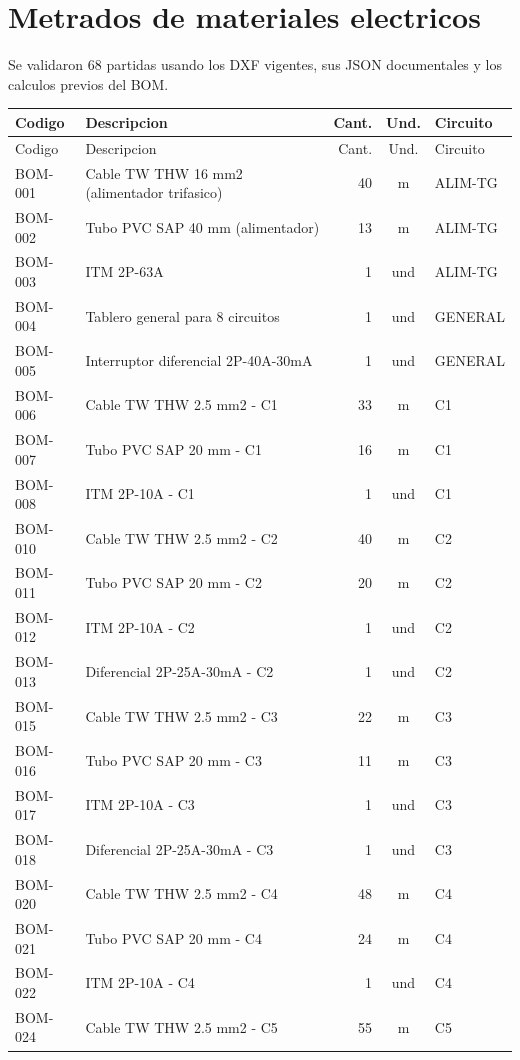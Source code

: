 \section{Metrados de materiales electricos}
Se validaron 68 partidas usando los DXF vigentes, sus JSON documentales y los calculos previos del BOM.
\scriptsize
\begin{longtable}{p{1.7cm}p{7.5cm}r c p{2.2cm}}
\toprule Codigo & Descripcion & Cant. & Und. & Circuito \\ \midrule
\endfirsthead\toprule Codigo & Descripcion & Cant. & Und. & Circuito \\ \midrule\endhead
BOM-001 & Cable TW THW 16 mm2 (alimentador trifasico) & 40 & m & ALIM-TG \\
BOM-002 & Tubo PVC SAP 40 mm (alimentador) & 13 & m & ALIM-TG \\
BOM-003 & ITM 2P-63A & 1 & und & ALIM-TG \\
BOM-004 & Tablero general para 8 circuitos & 1 & und & GENERAL \\
BOM-005 & Interruptor diferencial 2P-40A-30mA & 1 & und & GENERAL \\
BOM-006 & Cable TW THW 2.5 mm2 - C1 & 33 & m & C1 \\
BOM-007 & Tubo PVC SAP 20 mm - C1 & 16 & m & C1 \\
BOM-008 & ITM 2P-10A - C1 & 1 & und & C1 \\
BOM-010 & Cable TW THW 2.5 mm2 - C2 & 40 & m & C2 \\
BOM-011 & Tubo PVC SAP 20 mm - C2 & 20 & m & C2 \\
BOM-012 & ITM 2P-10A - C2 & 1 & und & C2 \\
BOM-013 & Diferencial 2P-25A-30mA - C2 & 1 & und & C2 \\
BOM-015 & Cable TW THW 2.5 mm2 - C3 & 22 & m & C3 \\
BOM-016 & Tubo PVC SAP 20 mm - C3 & 11 & m & C3 \\
BOM-017 & ITM 2P-10A - C3 & 1 & und & C3 \\
BOM-018 & Diferencial 2P-25A-30mA - C3 & 1 & und & C3 \\
BOM-020 & Cable TW THW 2.5 mm2 - C4 & 48 & m & C4 \\
BOM-021 & Tubo PVC SAP 20 mm - C4 & 24 & m & C4 \\
BOM-022 & ITM 2P-10A - C4 & 1 & und & C4 \\
BOM-024 & Cable TW THW 2.5 mm2 - C5 & 55 & m & C5 \\

\end{longtable}
